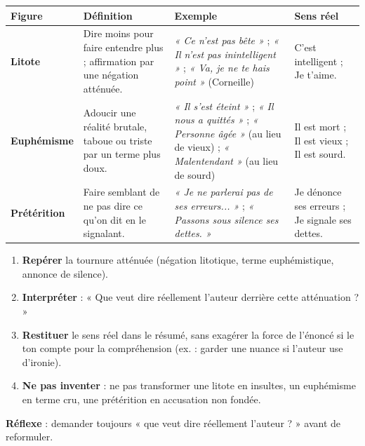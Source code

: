 \documentclass[11pt]{article}
\begin{document}
\begin{propriete}
\begin{center}
\begin{tabularx}{\linewidth}{|l|X|X|X|}\hline
\textbf{Figure} & \textbf{Définition} & \textbf{Exemple} & \textbf{Sens réel} \\ \hline
\textbf{Litote} & Dire moins pour faire entendre plus ; affirmation par une négation atténuée. & \emph{« Ce n'est pas bête »} ; \emph{« Il n'est pas inintelligent »} ; \emph{« Va, je ne te hais point »} (Corneille) & C'est intelligent ; Je t'aime. \\ \hline
\textbf{Euphémisme} & Adoucir une réalité brutale, taboue ou triste par un terme plus doux. & \emph{« Il s'est éteint »} ; \emph{« Il nous a quittés »} ; \emph{« Personne âgée »} (au lieu de vieux) ; \emph{« Malentendant »} (au lieu de sourd) & Il est mort ; Il est vieux ; Il est sourd. \\ \hline
\textbf{Prétérition} & Faire semblant de ne pas dire ce qu'on dit en le signalant. & \emph{« Je ne parlerai pas de ses erreurs... »} ; \emph{« Passons sous silence ses dettes. »} & Je dénonce ses erreurs ; Je signale ses dettes. \\ \hline
\end{tabularx}
\end{center}
\end{propriete}

\begin{methode}
\begin{enumerate}
\item \textbf{Repérer} la tournure atténuée (négation litotique, terme euphémistique, annonce de silence).
\item \textbf{Interpréter} : « Que veut dire réellement l'auteur derrière cette atténuation ? »
\item \textbf{Restituer} le sens réel dans le résumé, sans exagérer la force de l'énoncé si le ton compte pour la compréhension (ex. : garder une nuance si l'auteur use d'ironie).
\item \textbf{Ne pas inventer} : ne pas transformer une litote en insultes, un euphémisme en terme cru, une prétérition en accusation non fondée.
\end{enumerate}
\textbf{Réflexe} : demander toujours « que veut dire réellement l'auteur ? » avant de reformuler.
\end{methode}
\end{document}
